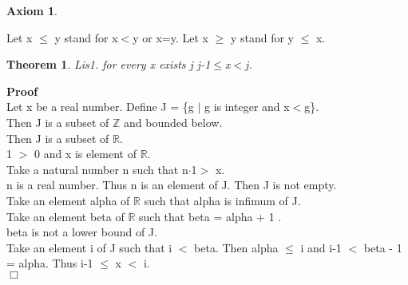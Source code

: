 \documentclass{article}
\newenvironment{forthel}{\begin{leftbar}}{\end{leftbar}}
\newenvironment{proof}{\noindent\textbf{Proof\ }}{\hspace*{\fill}$\Box$\medskip}
\newtheorem{axiom}{Axiom}
\newtheorem{theorem}{Theorem}
\begin{document}
\begin{forthel}
\begin{axiom}
\end{axiom}

Let x $\leq$ y stand for x$<$y or x=y.
Let x $\geq$ y stand for y $\leq$ x.

\begin{theorem}
 Lis1. for every x exists j j-1$\leq$x$<$j.
\end{theorem}\begin{proof}\\
Let x be a real number.
Define J = \{g $|$ g is integer and x$<$g\}.\\
Then J is a subset of $\mathbb{Z}$ and bounded below.\\
Then J is a subset of $\mathbb{R}$.\\
1 $>$ 0 and x is element of $\mathbb{R}$.\\
Take a natural number n such that n$\cdot$1$>$ x.\\
n is a real number. Thus n is an element of J. Then J is not empty.\\
Take an element alpha of $\mathbb{R}$ such that alpha is infimum of J.\\
Take an element beta of $\mathbb{R}$ such that beta = alpha + 1 .\\
beta is not a lower bound of J.\\
Take an element i of J such that i $<$ beta. Then  alpha $\leq$ i and i-1 $<$ beta - 1 = alpha. Thus i-1 $\leq$ x $<$ i.\\

\end{proof}














\end{forthel}
\end{document}
